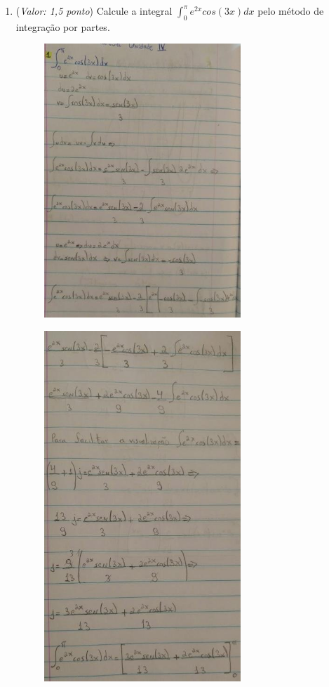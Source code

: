 \documentclass[a4paper, 12pt]{article}
\begin{document}
\begin{enumerate}
\item ({\it Valor: 1,5 ponto}) Calcule a integral $ \int_0^{\pi}e^{2x}cos(3x)dx$ pelo método de integração por partes.
  \begin{figure}[h!]
  \centering
  \includegraphics[width=0.7\textwidth]{1_1}
  \end{figure} \newpage

  \begin{figure}[h!]
  \centering
  \includegraphics[width=0.7\textwidth]{1_2}
  \end{figure} \newpage


\end{enumerate}
\end{document}
